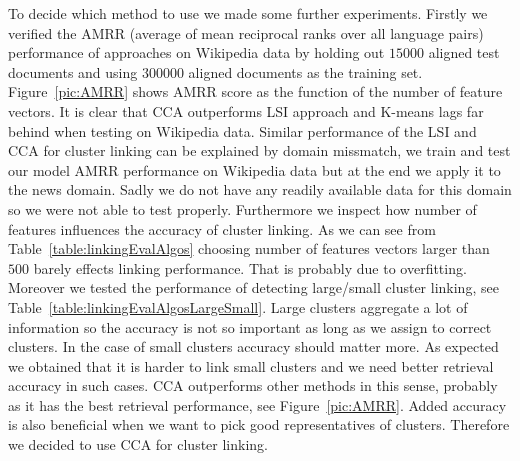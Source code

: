 \documentclass[twoside,11pt]{article}
\newcommand{\oldText}[1]{\textcolor{red}{#1:}\color{blue}}
\begin{document}
To decide which method to use we made some further experiments. Firstly we verified the AMRR (average of mean reciprocal ranks over all language pairs) performance of approaches on Wikipedia data by holding out $15000$ aligned test documents and using $300000$ aligned documents
 as the training set. Figure~\ref{pic:AMRR} shows AMRR score as the function of the number of feature vectors. It is clear that CCA outperforms LSI approach and K-means lags far behind when testing on Wikipedia data. Similar performance of the LSI and CCA for cluster linking can be explained by domain missmatch, we train and test our model  AMRR performance on Wikipedia data but at the end we apply it to the news domain. Sadly we do not have any readily available data for this domain so we were not able to test properly.
Furthermore we inspect how number of features influences the accuracy of cluster linking. As we can see from Table~\ref{table:linkingEvalAlgos} choosing number of features vectors larger than $500$ barely effects linking performance. That is probably due to overfitting. Moreover we tested the performance of detecting large/small cluster linking, see Table~\ref{table:linkingEvalAlgosLargeSmall}. Large clusters aggregate a lot of information so the accuracy is not so important as long as we assign to correct clusters. In the case of small clusters accuracy should matter more.  As expected we obtained that it is harder to link small clusters and we need better retrieval accuracy in such cases. CCA outperforms other methods in this sense, probably as it has the best retrieval performance, see Figure~\ref{pic:AMRR}. Added accuracy is also beneficial when we want
to pick good representatives of clusters. Therefore we decided to use CCA for cluster linking.

\end{document}
